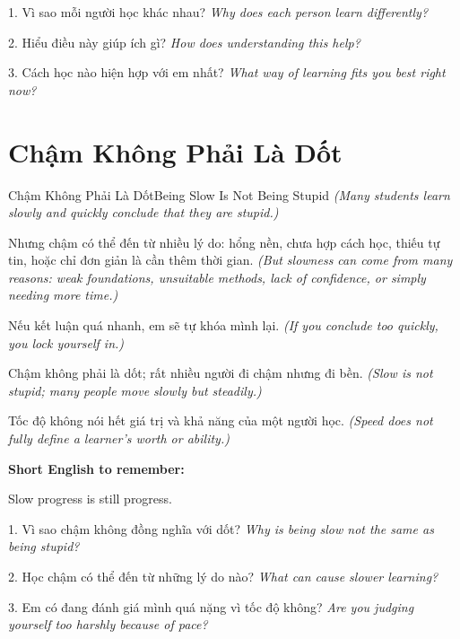 \begin{tuhocnhanh}
1. Vì sao mỗi người học khác nhau? \textit{Why does each person learn differently?}

2. Hiểu điều này giúp ích gì? \textit{How does understanding this help?}

3. Cách học nào hiện hợp với em nhất? \textit{What way of learning fits you best right now?}
\end{tuhocnhanh}
\ngancach

\section{Chậm Không Phải Là Dốt}
\begin{truyen}{Chậm Không Phải Là Dốt}{Being Slow Is Not Being Stupid}
\textit{(Many students learn slowly and quickly conclude that they are stupid.)}

Nhưng chậm có thể đến từ nhiều lý do: hổng nền, chưa hợp cách học, thiếu tự tin, hoặc chỉ đơn giản là cần thêm thời gian.
\textit{(But slowness can come from many reasons: weak foundations, unsuitable methods, lack of confidence, or simply needing more time.)}

Nếu kết luận quá nhanh, em sẽ tự khóa mình lại.
\textit{(If you conclude too quickly, you lock yourself in.)}

Chậm không phải là dốt; rất nhiều người đi chậm nhưng đi bền.
\textit{(Slow is not stupid; many people move slowly but steadily.)}
\end{truyen}

\begin{baihoc}
Tốc độ không nói hết giá trị và khả năng của một người học.
\textit{(Speed does not fully define a learner's worth or ability.)}
\end{baihoc}

\begin{ghinhoanh}
\textbf{Short English to remember:}

Slow progress is still progress.

\end{ghinhoanh}

\begin{tuhocnhanh}
1. Vì sao chậm không đồng nghĩa với dốt? \textit{Why is being slow not the same as being stupid?}

2. Học chậm có thể đến từ những lý do nào? \textit{What can cause slower learning?}

3. Em có đang đánh giá mình quá nặng vì tốc độ không? \textit{Are you judging yourself too harshly because of pace?}
\end{tuhocnhanh}
\ngancach

